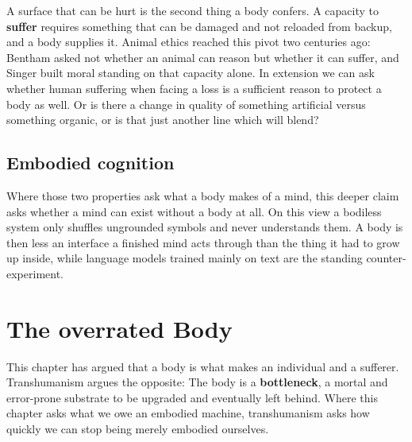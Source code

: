 \noindent A surface that can be hurt is the second thing a body confers. A
capacity to \textbf{suffer} requires something that can be damaged and not
reloaded from backup, and a body supplies it. Animal ethics reached this pivot
two centuries ago: Bentham\cite{bentham1789principles} asked not whether an
animal can reason but whether it can suffer, and Singer\cite{singer1975animal}
built moral standing on that capacity alone. In
extension we can ask whether human suffering when facing a loss is a sufficient
reason to protect a body as well. Or is there a change in quality of something 
artificial versus something organic, or is that just another line which will blend? 



\subsection*{Embodied cognition}


\noindent Where those two properties ask what a body makes of a mind, this
deeper claim asks whether a mind can exist without a body at all. On this view
a bodiless system only shuffles ungrounded
symbols and never understands them. A body is then less an interface a finished mind acts through than the
thing it had to grow up inside, while language models trained mainly on text are
the standing counter-experiment.


\section*{The overrated Body}


\noindent This chapter has argued that a body is what makes an individual
and a sufferer. Transhumanism argues the opposite: The body is a
\textbf{bottleneck}, a mortal and error-prone substrate to be upgraded and
eventually left behind. Where this chapter asks what we owe an embodied
machine, transhumanism asks how quickly we can stop being merely embodied
ourselves.

